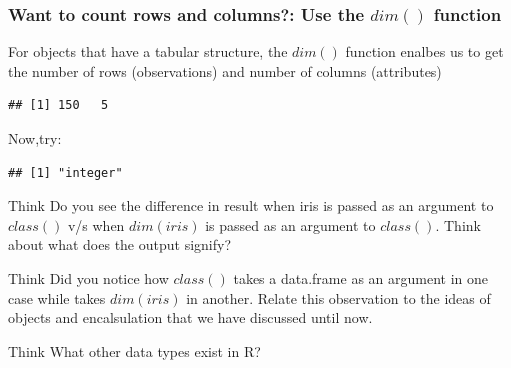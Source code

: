 \subsubsection{Want to count rows and columns?: Use the $dim()$ function}
\noindent For objects that have a tabular structure, the $dim()$ function enalbes us to get the number of rows (observations) and number of columns (attributes)  
\begin{knitrout}
\color{fgcolor}\begin{kframe}
\begin{alltt}
\end{alltt}
\begin{verbatim}
## [1] 150   5
\end{verbatim}
\end{kframe}
\end{knitrout}
\noindent Now,try:
\begin{knitrout}
\color{fgcolor}\begin{kframe}
\begin{alltt}
\hlstd{(}
\end{alltt}
\begin{verbatim}
## [1] "integer"
\end{verbatim}
\end{kframe}
\end{knitrout}
\begin{DIY}{Think}
Do you see the difference in result when iris is passed as an argument to $class()$ v/s when $dim(iris)$ is passed as an argument to $class()$. Think about what does the output signify?   
\end{DIY}

\begin{DIY}{Think}
Did you notice how $class()$ takes a data.frame as an argument in one case while takes $dim(iris)$ in another. Relate this observation to the ideas of objects and encalsulation that we have discussed until now.   
\end{DIY}

\begin{DIY}{Think}
What other data types exist in R?   
\end{DIY}
